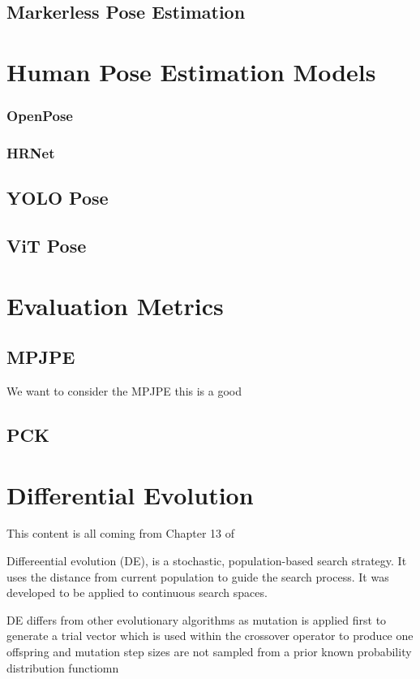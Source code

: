\subsection{Markerless Pose Estimation}

\section{Human Pose Estimation Models}
\subsubsection{OpenPose}
\subsubsection{HRNet}
\subsection{YOLO Pose}
\subsection{ViT Pose}

\section{Evaluation Metrics}
\subsection{MPJPE}

We want to consider the MPJPE this is a good 

\subsection{PCK}

\section{Differential Evolution}

This content is all coming from Chapter 13 of \citet{engelbrecht2007computational}

Differeential evolution (DE), is a stochastic, population-based search
strategy. It uses the distance from current population to guide the search process. It was developed to
be applied to continuous search spaces. \cite{engelbrecht2007computational}

DE differs from other evolutionary algorithms as mutation is applied first to generate a trial 
vector which is used within the crossover operator to produce one offspring and mutation step sizes are not 
sampled from a prior known probability distribution functiomn

